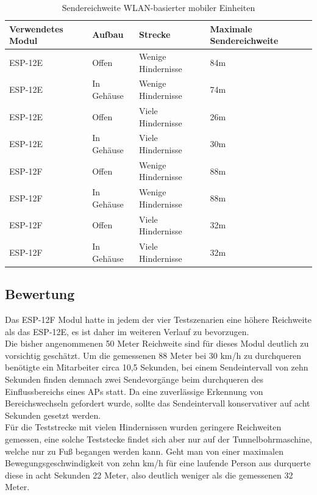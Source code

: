 \begin{table}[h]
	\centering
	\caption{Sendereichweite WLAN-basierter mobiler Einheiten}
	\label{table:rangewifi}
	\begin{tabular}{p{3.5cm}|p{3cm}|p{3.5cm}|p{3cm}}
		Verwendetes Modul & Aufbau & Strecke & Maximale Sendereichweite \\
		\hline
		ESP-12E & Offen & Wenige Hindernisse & 84m \\
		ESP-12E & In Gehäuse & Wenige Hindernisse & 74m \\
		ESP-12E & Offen & Viele Hindernisse & 26m \\
		ESP-12E & In Gehäuse & Viele Hindernisse & 30m \\
		\hline
		ESP-12F & Offen & Wenige Hindernisse & 88m \\
		ESP-12F & In Gehäuse & Wenige Hindernisse & 88m \\
		ESP-12F & Offen & Viele Hindernisse & 32m \\
		ESP-12F & In Gehäuse & Viele Hindernisse & 32m \\
	\end{tabular}
\end{table}


\subsection{Bewertung}
\label{ch:Reichweite:sec:bewertung}
Das ESP-12F Modul hatte in jedem der vier Testszenarien eine höhere Reichweite als das ESP-12E, es ist daher im weiteren Verlauf zu bevorzugen.\\
Die bisher angenommenen 50 Meter Reichweite sind für dieses Modul deutlich zu vorsichtig geschätzt. 
Um die gemessenen 88 Meter bei 30 km/h zu durchqueren benötigte ein Mitarbeiter circa 10,5 Sekunden, bei einem Sendeintervall von zehn Sekunden finden demnach zwei Sendevorgänge beim durchqueren des Einflussbereichs eines APs statt.
Da eine zuverlässige Erkennung von Bereichswechseln gefordert wurde, sollte das Sendeintervall konservativer auf acht Sekunden gesetzt werden.\\
Für die Teststrecke mit vielen Hindernissen wurden geringere Reichweiten gemessen, eine solche Teststecke findet sich aber nur auf der Tunnelbohrmaschine, welche nur zu Fuß begangen werden kann. 
Geht man von einer maximalen Bewegungsgeschwindigkeit von zehn km/h für eine laufende Person aus durquerte diese in acht Sekunden 22 Meter, also deutlich weniger als die gemessenen 32 Meter.\\





